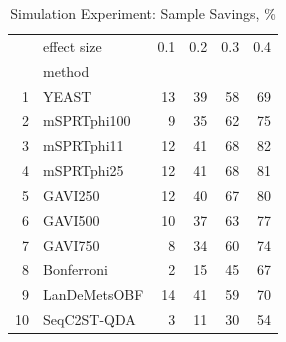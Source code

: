 \begin{table}[ht]
\caption{Simulation Experiment: Sample Savings, \%}\label{tbl:mainExperimentSavings}
\centering
\begin{small}
\begin{tabular}{rlrrrr}
  \hline
  & effect size & 0.1 & 0.2 & 0.3 & 0.4\\
  & method & & & & \\
  \hline
  1 & YEAST & 13 & 39 & 58 & 69 \\
  2 & mSPRTphi100 & 9 & 35 & 62 & 75 \\
  3 & mSPRTphi11 & 12 & 41 & 68 & 82 \\
  4 & mSPRTphi25 & 12 & 41 & 68 & 81 \\
  5 & GAVI250 & 12 & 40 & 67 & 80 \\
  6 & GAVI500 & 10 & 37 & 63 & 77 \\
  7 & GAVI750 & 8 & 34 & 60 & 74 \\
  8 & Bonferroni & 2 & 15 & 45 & 67 \\
  9 & LanDeMetsOBF & 14 & 41 & 59 & 70 \\
  10 & SeqC2ST-QDA & 3 & 11 & 30 & 54 \\
   \hline
\end{tabular}
\end{small}
\end{table}
